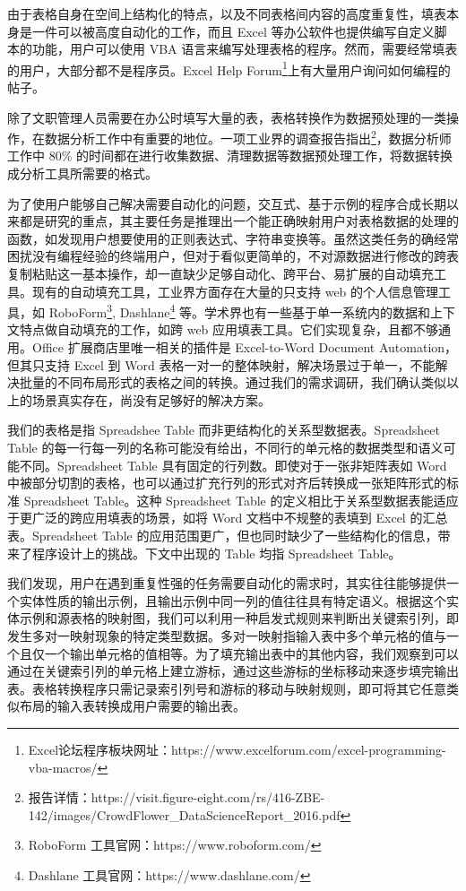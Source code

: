 \documentclass[design, pageheader]{njubachelor}
\begin{document}
由于表格自身在空间上结构化的特点，以及不同表格间内容的高度重复性，填表本身是一件可以被高度自动化的工作，而且 Excel 等办公软件也提供编写自定义脚本的功能，用户可以使用 VBA 语言来编写处理表格的程序。然而，需要经常填表的用户，大部分都不是程序员。Excel Help Forum\footnote{Excel论坛程序板块网址：https://www.excelforum.com/excel-programming-vba-macros/}上有大量用户询问如何编程的帖子。

除了文职管理人员需要在办公时填写大量的表，表格转换作为数据预处理的一类操作，在数据分析工作中有重要的地位\cite{kandel11.2}。一项工业界的调查报告指出\footnote{报告详情：https://visit.figure-eight.com/rs/416-ZBE-142/images/CrowdFlower\_DataScienceReport\_2016.pdf}，数据分析师工作中 80\% 的时间都在进行收集数据、清理数据等数据预处理工作，将数据转换成分析工具所需要的格式。

为了使用户能够自己解决需要自动化的问题，交互式、基于示例的程序合成长期以来都是研究的重点\cite{gulwani15}，其主要任务是推理出一个能正确映射用户对表格数据的处理的函数，如发现用户想要使用的正则表达式\cite{raza17}、字符串变换\cite{gulwani11}等。虽然这类任务的确经常困扰没有编程经验的终端用户，但对于看似更简单的，不对源数据进行修改的跨表复制粘贴这一基本操作，却一直缺少足够自动化、跨平台、易扩展的自动填充工具。现有的自动填充工具，工业界方面存在大量的只支持 web 的个人信息管理工具，如 RoboForm\footnote{RoboForm 工具官网：https://www.roboform.com/}, Dashlane\footnote{Dashlane 工具官网：https://www.dashlane.com/} 等。学术界也有一些基于单一系统内的数据和上下文特点做自动填充的工作，如跨 web 应用填表工具\cite{wang13}。它们实现复杂，且都不够通用。Office 扩展商店里唯一相关的插件是 Excel-to-Word Document Automation， 但其只支持 Excel 到 Word 表格一对一的整体映射，解决场景过于单一，不能解决批量的不同布局形式的表格之间的转换。通过我们的需求调研，我们确认类似以上的场景真实存在，尚没有足够好的解决方案。

我们的表格是指 Spreadshee Table 而非更结构化的关系型数据表。Spreadsheet Table 的每一行每一列的名称可能没有给出，不同行的单元格的数据类型和语义可能不同。Spreadsheet Table 具有固定的行列数。即使对于一张非矩阵表如 Word 中被部分切割的表格，也可以通过扩充行列的形式对齐后转换成一张矩阵形式的标准 Spreadsheet Table。这种 Spreadsheet Table 的定义相比于关系型数据表能适应于更广泛的跨应用填表的场景，如将 Word 文档中不规整的表填到 Excel 的汇总表。Spreadsheet Table 的应用范围更广，但也同时缺少了一些结构化的信息，带来了程序设计上的挑战。下文中出现的 Table 均指 Spreadsheet Table。

我们发现，用户在遇到重复性强的任务需要自动化的需求时，其实往往能够提供一个实体性质的输出示例，且输出示例中同一列的值往往具有特定语义。根据这个实体示例和源表格的映射图，我们可以利用一种启发式规则来判断出关键索引列，即发生多对一映射现象的特定类型数据。多对一映射指输入表中多个单元格的值与一个且仅一个输出单元格的值相等。为了填充输出表中的其他内容，我们观察到可以通过在关键索引列的单元格上建立游标，通过这些游标的坐标移动来逐步填完输出表。表格转换程序只需记录索引列号和游标的移动与映射规则，即可将其它任意类似布局的输入表转换成用户需要的输出表。
\end{document}
